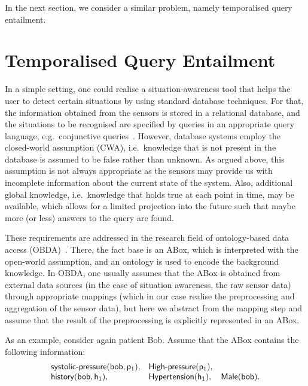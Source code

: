 In the next section, we consider a similar problem, namely temporalised query
entailment.


\section{Temporalised Query Entailment}\label{sec:intro-tcqs}

In a simple setting, one could realise a situation-awareness tool that helps the
user to detect certain situations by using standard database techniques.  For
that, the information obtained from the sensors is stored in a relational
database, and the situations to be recognised are specified by queries in an
appropriate query language, e.g.~conjunctive queries~\cite{AbHV-95}.
%
However, database systems employ the closed-world assumption (CWA),
i.e.~knowledge that is not present in the database is assumed to be false rather
than unknown.  As argued above, this assumption is not always appropriate as the
sensors may provide us with incomplete information about the current state of
the system.  Also, additional global knowledge, i.e.~knowledge that holds true
at each point in time, may be available, which allows for a limited projection
into the future such that maybe more (or less) answers to the query are found.

These requirements are addressed in the research field of ontology-based data
access (OBDA)~\cite{DEF+-DS99,PCD+-JoDS08}.  There, the fact base is an ABox,
which is interpreted with the open-world assumption, and an ontology is used to
encode the background knowledge.
%
In OBDA, one usually assumes that the ABox is obtained from external data sources
(in the case of situation awareness, the raw sensor data) through appropriate
mappings (which in our case realise the preprocessing and aggregation of the
sensor data), but here we abstract from the mapping step and assume that the
result of the preprocessing is explicitly represented in an ABox.

As an example, consider again patient Bob.  Assume that the ABox contains the
following information:
\[\begin{array}{lll}
     \mathsf{systolic\text{-}pressure}(\mathsf{bob},\mathsf{p}_1),
    &\mathsf{High\text{-}pressure}(\mathsf{p}_1),
    &\\
     \mathsf{history}(\mathsf{bob},\mathsf{h}_1),
    &\mathsf{Hypertension}(\mathsf{h}_1),
    &\mathsf{Male}(\mathsf{bob}).
\end{array}\]

